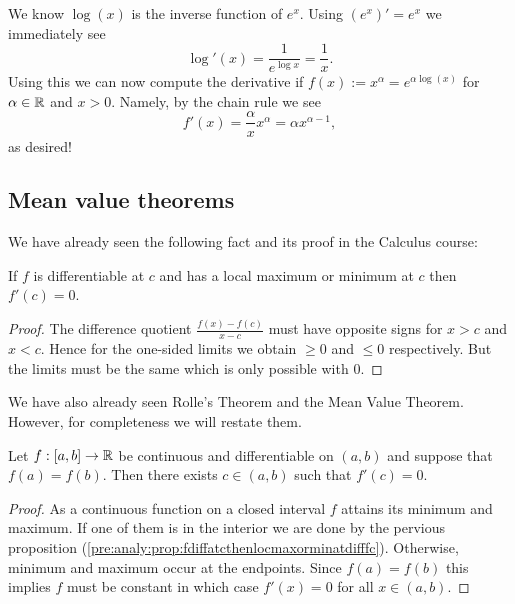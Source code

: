 \documentclass[10pt, a4paper]{article}
\begin{document}
\begin{example}
    We know $\log(x)$ is the inverse function of $e ^ x$.
    Using $(e ^ x)' = e ^ x$ we immediately see
    \[
    \log'(x) = \frac{1}{e ^ {\log{x}}} = \frac{1}{x}.
    \]
    Using this we can now compute the derivative if $f(x) := x ^ \alpha = e ^ {\alpha\log(x)}$ for $\alpha \in \mathbb{R}$ and $x > 0$.
    Namely,
    by the chain rule we see
    \[
    f'(x) = \frac{\alpha}{x}x ^ \alpha = \alpha x ^ {\alpha - 1},
    \]
    as desired!
\end{example}

\subsection{Mean value theorems}

We have already seen the following fact and its proof in the Calculus course:
\begin{proposition}\label{pre:analy:prop:fdiffatcthenlocmaxorminatdifffc}
    If $f$ is differentiable at $c$ and has a local maximum or minimum at $c$ then $f'(c) = 0$.

    \begin{proof}
        The difference quotient $\frac{f(x) - f(c)}{x - c}$ must have opposite signs for $x > c$ and $x < c$.
        Hence for the one-sided limits we obtain $\geq 0$ and $\leq 0$ respectively.
        But the limits must be the same which is only possible with $0$.
    \end{proof}
\end{proposition}

We have also already seen Rolle's Theorem and the Mean Value Theorem.
However,
for completeness we will restate them.
\begin{theorem}\label{pre:analy:thm:rollesthm}
    Let $f : [a, b] \rightarrow \mathbb{R}$ be continuous and differentiable on $(a, b)$ and suppose that $f(a) = f(b)$.
    Then there exists $c \in (a, b)$ such that $f'(c) = 0$.
    \begin{proof}
        As a continuous function on a closed interval $f$ attains its minimum and maximum.
        If one of them is in the interior we are done by the pervious proposition        
        (\autoref{pre:analy:prop:fdiffatcthenlocmaxorminatdifffc}).
        Otherwise,
        minimum and maximum occur at the endpoints.
        Since $f(a) = f(b)$ this implies $f$ must be constant in which case $f'(x) = 0$ for all $x \in (a, b)$.
    \end{proof}
\end{theorem}
\end{document}
